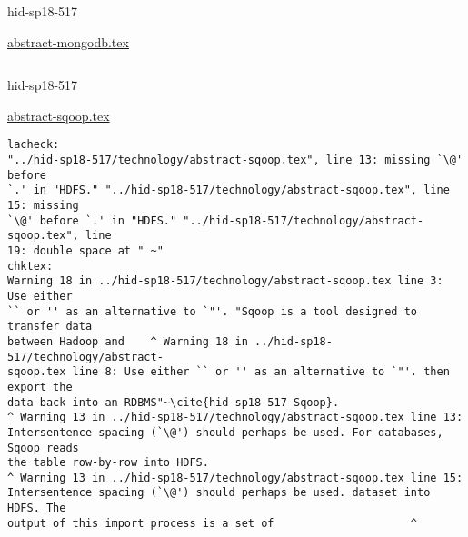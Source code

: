

\begin{IU}

hid-sp18-517

\href{https://github.com/cloudmesh-community/hid-sp18-517/blob/master//technology/abstract-mongodb.tex}{abstract-mongodb.tex}

\begin{tiny}
\begin{verbatim}
\end{verbatim}
\end{tiny}
\end{IU}



\begin{IU}

hid-sp18-517

\href{https://github.com/cloudmesh-community/hid-sp18-517/blob/master//technology/abstract-sqoop.tex}{abstract-sqoop.tex}

\begin{tiny}
\begin{verbatim}
lacheck:
"../hid-sp18-517/technology/abstract-sqoop.tex", line 13: missing `\@' before
`.' in "HDFS." "../hid-sp18-517/technology/abstract-sqoop.tex", line 15: missing
`\@' before `.' in "HDFS." "../hid-sp18-517/technology/abstract-sqoop.tex", line
19: double space at " ~"
chktex:
Warning 18 in ../hid-sp18-517/technology/abstract-sqoop.tex line 3: Use either
`` or '' as an alternative to `"'. "Sqoop is a tool designed to transfer data
between Hadoop and    ^ Warning 18 in ../hid-sp18-517/technology/abstract-
sqoop.tex line 8: Use either `` or '' as an alternative to `"'. then export the
data back into an RDBMS"~\cite{hid-sp18-517-Sqoop}.
^ Warning 13 in ../hid-sp18-517/technology/abstract-sqoop.tex line 13:
Intersentence spacing (`\@') should perhaps be used. For databases, Sqoop reads
the table row-by-row into HDFS.
^ Warning 13 in ../hid-sp18-517/technology/abstract-sqoop.tex line 15:
Intersentence spacing (`\@') should perhaps be used. dataset into HDFS. The
output of this import process is a set of                     ^
\end{verbatim}
\end{tiny}
\end{IU}



